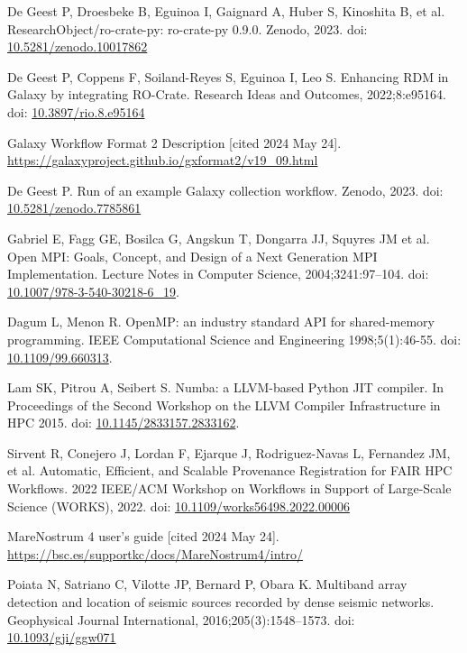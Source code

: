 \documentclass[10pt,letterpaper]{article}
\begin{document}
\begin{thebibliography}{10}
\begin{small}
De Geest P, Droesbeke B, Eguinoa I, Gaignard A, Huber S, Kinoshita B, et al.
ResearchObject/ro-crate-py: ro-crate-py 0.9.0.
Zenodo, 2023.
doi: \href{https://doi.org/10.5281/zenodo.10017862}{10.5281/zenodo.10017862}

De Geest P, Coppens F, Soiland-Reyes S, Eguinoa I, Leo S.
Enhancing RDM in Galaxy by integrating RO-Crate.
Research Ideas and Outcomes, 2022;8:e95164.
doi: \href{https://doi.org/10.3897/rio.8.e95164}{10.3897/rio.8.e95164}

Galaxy Workflow Format 2 Description [cited 2024 May 24].
\url{https://galaxyproject.github.io/gxformat2/v19_09.html}

De Geest P.
Run of an example Galaxy collection workflow.
Zenodo, 2023.
doi: \href{https://doi.org/10.5281/zenodo.7785861}{10.5281/zenodo.7785861}

Gabriel E, Fagg GE, Bosilca G, Angskun T, Dongarra JJ, Squyres JM et al.
Open MPI: Goals, Concept, and Design of a Next Generation MPI Implementation.
Lecture Notes in Computer Science, 2004;3241:97--104.
doi: \href{https://doi.org/10.1007/978-3-540-30218-6_19}{10.1007/978-3-540-30218-6\_19}.

Dagum L, Menon R.
OpenMP: an industry standard API for shared-memory programming.
IEEE Computational Science and Engineering 1998;5(1):46-55.
doi: \href{https://doi.org/10.1109/99.660313}{10.1109/99.660313}.

Lam SK, Pitrou A, Seibert S.
Numba: a LLVM-based Python JIT compiler.
In Proceedings of the Second Workshop on the LLVM Compiler Infrastructure in HPC 2015.
doi: \href{https://doi.org/10.1145/2833157.2833162}{10.1145/2833157.2833162}.

Sirvent R, Conejero J, Lordan F, Ejarque J, Rodriguez-Navas L, Fernandez JM, et al.
Automatic, Efficient, and Scalable Provenance Registration for FAIR HPC Workflows.
2022 IEEE/ACM Workshop on Workflows in Support of Large-Scale Science (WORKS), 2022.
doi: \href{https://doi.org/10.1109/works56498.2022.00006}{10.1109/works56498.2022.00006}

MareNostrum 4 user's guide [cited 2024 May 24].
\url{https://bsc.es/supportkc/docs/MareNostrum4/intro/}

Poiata N, Satriano C, Vilotte JP, Bernard P, Obara K.
Multiband array detection and location of seismic sources recorded by dense seismic networks.
Geophysical Journal International, 2016;205(3):1548--1573.
doi: \href{https://doi.org/10.1093/gji/ggw071}{10.1093/gji/ggw071}


\end{small}
\end{thebibliography}
\end{document}
